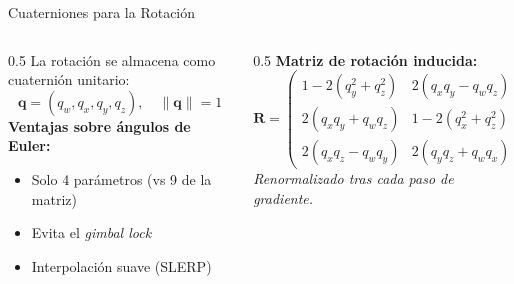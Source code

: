 \begin{frame}{Cuaterniones para la Rotación}
  \begin{columns}
    \begin{column}{0.5\textwidth}
      La rotación se almacena como cuaternión unitario:
      \[
        \mathbf{q} = (q_w, q_x, q_y, q_z), \quad \|\mathbf{q}\| = 1
      \]
      \textbf{Ventajas sobre ángulos de Euler:}
      \begin{itemize}
        \item Solo 4 parámetros (vs 9 de la matriz)
        \item Evita el \emph{gimbal lock}
        \item Interpolación suave (SLERP)
      \end{itemize}
    \end{column}
    \begin{column}{0.5\textwidth}
      \textbf{Matriz de rotación inducida:}
      \[
        \mathbf{R} = \begin{pmatrix}
          1-2(q_y^2+q_z^2) & 2(q_xq_y-q_wq_z) & 2(q_xq_z+q_wq_y)\\
          2(q_xq_y+q_wq_z) & 1-2(q_x^2+q_z^2) & 2(q_yq_z-q_wq_x)\\
          2(q_xq_z-q_wq_y) & 2(q_yq_z+q_wq_x) & 1-2(q_x^2+q_y^2)
        \end{pmatrix}
      \]
      \vspace{0.3em}
      \textit{Renormalizado tras cada paso de gradiente.}
    \end{column}
  \end{columns}
\end{frame}
